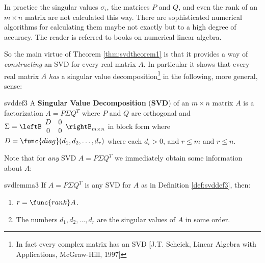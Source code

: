 In practice the singular values $\sigma_{i}$, the matrices $P$ and $Q$, and
even the rank of an $m\times n$ matrix are not calculated this way. There
are sophisticated numerical algorithms for calculating them maybe not exactly but to a high degree
of accuracy. The reader is referred to books on numerical linear algebra.

So the main virtue of Theorem \ref{thm:svdtheorem1} is that it provides a way of \emph{constructing} an SVD for every real matrix $A$. In particular it shows that
every real matrix $A$ \emph{has} a singular value decomposition\footnote{In fact every complex matrix has an SVD [J.T. Scheick, Linear Algebra with
Applications, McGraw-Hill, 1997]} in the following, more general,
sense:

\begin{definition}{}{svddef3}
A \textbf{Singular Value Decomposition} (\textbf{SVD}) of an $m\times n$ matrix $A$ is a factorization $A=P\Sigma Q^{T}$ where $P$ and $Q$ are orthogonal and $\Sigma =  
\leftB 
\begin{array}{cc}
D & 0 \\ 
0 & 0
\end{array}
\rightB_{m\times n}$ in block form where $D=\func{diag}(d_{1},d_{2},\ldots ,d_{r})$ where each $d_{i}>0$, and $r\leq m$ and $r\leq n$.
\end{definition}

\noindent Note that for \emph{any} SVD $A=P\Sigma Q^{T}$ we immediately
obtain some information about $A$:

\begin{lemma}{}{svdlemma3} 
If $A=P\Sigma Q^{T}$ is any SVD for $A$ as in Definition \ref{def:svddef3}, then:

\begin{enumerate}
\item $r=\func{rank}A$.

\item The numbers $d_{1},d_{2},\dots ,d_{r}$ are the singular values of $A$ in some order.
\end{enumerate}
\end{lemma}

